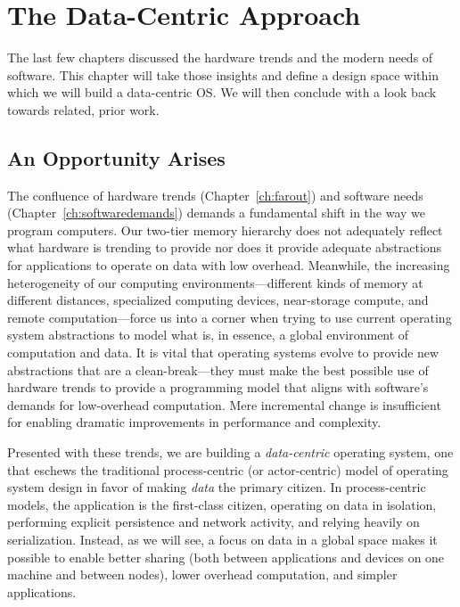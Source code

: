 
\chapter{The Data-Centric Approach}\label{ch:datacentric}


\begin{chabstract}
    The last few chapters discussed the hardware trends and the modern needs of software. This chapter will take those
    insights and define a design space within which we will build a data-centric OS. We will then conclude with a look
    back towards related, prior work.
\end{chabstract}

\section{An Opportunity Arises}


The confluence of hardware trends (Chapter~\ref{ch:farout}) and software needs (Chapter~\ref{ch:softwaredemands})
demands a fundamental shift in the way we program computers. Our two-tier memory hierarchy does not adequately reflect
what hardware is trending to provide nor does it provide adequate abstractions for applications to operate on data with
low overhead. Meanwhile, the increasing heterogeneity of our computing environments---different kinds of memory
at different distances, specialized computing devices, near-storage compute, and remote computation---force us into a
corner when trying to use current operating system abstractions to model what is, in essence, a global environment of computation and
data. It is vital that operating systems evolve to provide new abstractions that are a clean-break---they must make the
best possible use of hardware trends to provide a programming model that aligns with software's demands for low-overhead
computation. Mere incremental change is insufficient for enabling dramatic improvements in performance and complexity.

Presented with these trends, we are building a \emph{data-centric} operating system, one that eschews the traditional
process-centric (or actor-centric) model of operating system design in favor of making \emph{data} the primary citizen.
In process-centric models, the application is the first-class citizen, operating on data in isolation, performing
explicit persistence and network activity, and relying heavily on serialization. Instead, as we will see, a focus on data in a global
space makes it possible to enable better sharing (both between applications and devices on one machine and between
nodes), lower overhead computation, and simpler applications.

